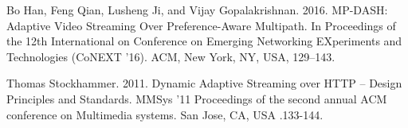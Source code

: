 \documentclass{llncs}
\begin{document}
\begin{thebibliography}{1}
Bo Han, Feng Qian, Lusheng Ji, and Vijay Gopalakrishnan. 2016. MP-DASH: Adaptive Video Streaming Over Preference-Aware Multipath. In Proceedings of the 12th International on Conference on Emerging Networking EXperiments and Technologies (CoNEXT ’16). ACM, New York, NY, USA, 129–143.

Thomas Stockhammer. 2011. Dynamic Adaptive Streaming over HTTP – Design Principles and Standards. MMSys '11 Proceedings of the second annual ACM conference on Multimedia systems. San Jose, CA, USA .133-144.


\end{thebibliography}
\end{document}
